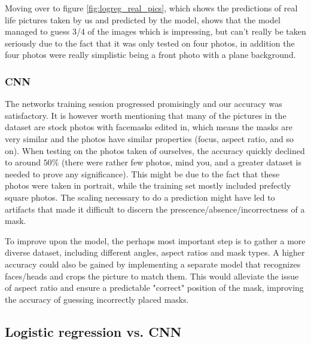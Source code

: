 \documentclass[../main.tex]{subfiles}
\begin{document}
Moving over to figure \ref{fig:logreg_real_pics}, which shows the predictions of real life pictures taken by us and predicted by the model, shows that the model managed to guess 3/4 of the images which is impressing, but can't really be taken seriously due to the fact that it was only tested on four photos, in addition the four photos were really simplistic being a front photo with a plane background.


\subsubsection{CNN}
The networks training session progressed promisingly and our accuracy was satisfactory. It is however worth mentioning that many of the pictures in the dataset are stock photos with facemasks edited in, which means the masks are very similar and the photos have similar properties (focus, aspect ratio, and so on). When testing on the photos taken of ourselves, the accuracy quickly declined to around $50\%$ (there were rather few photos, mind you, and a greater dataset is needed to prove any significance). This might be due to the fact that these photos were taken in portrait, while the training set mostly included prefectly square photos. The scaling necessary to do a prediction might have led to artifacts that made it difficult to discern the prescence/absence/incorrectness of a mask.

To improve upon the model, the perhaps most important step is to gather a more diverse dataset, including different angles, aspect ratios and mask types. A higher accuracy could also be gained by implementing a separate model that recognizes faces/heads and crops the picture to match them. This would alleviate the issue of aspect ratio and ensure a predictable "correct" position of the mask, improving the accuracy of guessing incorrectly placed masks.

\subsection{Logistic regression vs. CNN}
\end{document}
